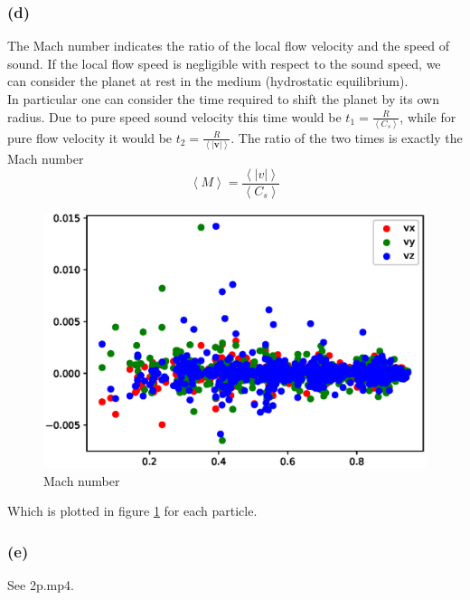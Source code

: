 \documentclass{article}
\begin{document}
\subsubsection*{(d)}
The Mach number indicates the ratio of the local flow velocity and the speed of sound. 
If the local flow speed is negligible with respect to the sound speed, we can consider the planet at rest in the medium (hydrostatic equilibrium). \\
In particular one can consider the time required to shift the planet by its own radius. Due to pure speed sound velocity this time would be $t_1 = \frac{R}{\left\langle C_s \right\rangle}$, while for pure 
flow velocity it would be $t_2 = \frac{R}{\left\langle |\mathbf{v}| \right\rangle}$. The ratio of the two times is exactly the Mach number  
\begin{equation*}
    \left\langle M \right\rangle = \frac{\left\langle |v| \right\rangle}{\left\langle C_s \right\rangle}
\end{equation*}
\begin{figure}[h]
    \centering 
    \includegraphics[scale=0.9]{mach.eps}
    \caption{Mach number}
    \label{fig:mach}
\end{figure}
Which is plotted in figure \ref{fig:mach} for each particle.

\subsubsection*{(e)}
See 2p.mp4.
\end{document}
